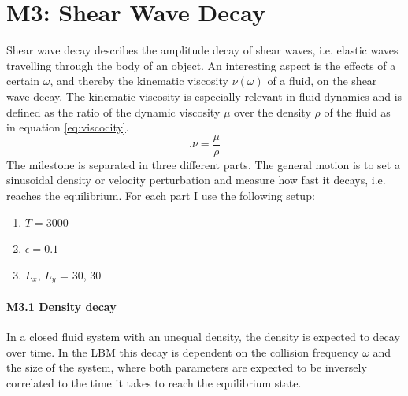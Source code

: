 \documentclass[a4paper,12pt, oneside]{book}
\begin{document}
\section{M3: Shear Wave Decay}
Shear wave decay describes the amplitude decay of shear waves, i.e. elastic waves travelling through the body of an object.
An interesting aspect is the effects of a certain $\omega$, and thereby the kinematic viscosity $\nu(\omega)$ of a fluid, on the shear wave decay.
The kinematic viscosity is especially relevant in fluid dynamics and is defined as the ratio of the dynamic viscosity $\mu$ over the density $\rho$ of the fluid as in equation \ref{eq:viscocity}.
\begin{equation}\label{eq:viscocity}.
\nu = \frac{\mu}{\rho}
\end{equation}
The milestone is separated in three different parts. 
The general motion is to set a sinusoidal density or velocity
perturbation and measure how fast it decays, i.e. reaches the equilibrium.
For each part I use the following setup:
\begin{enumerate}
    \item $T = 3000$
    \item $\epsilon = 0.1$
    \item $L_{x}$, $L_{y}$ = 30, 30
\end{enumerate}


\paragraph{M3.1 Density decay} 
In a closed fluid system with an unequal density, the density is expected to decay over time. In the LBM this decay is dependent on the collision frequency $\omega$ and the size of the system, where both parameters are expected to be inversely correlated to the time it takes to reach the equilibrium state.
\end{document}
